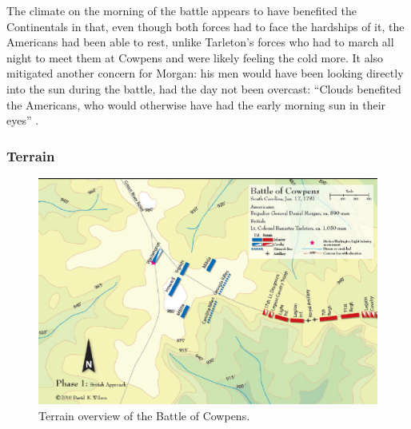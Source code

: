 The climate on the morning of the battle appears to have benefited the
Continentals in that, even though both forces had to face the hardships of it,
the Americans had been able to rest, unlike Tarleton's forces who had to march
all night to meet them at Cowpens and were likely feeling the cold more.  It
also mitigated another concern for Morgan: his men would have been looking
directly into the sun during the battle, had the day not been overcast:
``Clouds benefited the Americans, who would otherwise have had the early
morning sun in their eyes'' \cite[67]{moncure_cowpens_1996}.  

\subsubsection{Terrain}

\begin{figure}[h]
    \begin{center}
    \includegraphics[width=\textwidth]{gfx/futch1}
    \end{center}
    \caption{Terrain overview of the Battle of Cowpens. \cite{wilson_blogmap}}
    \label{terrain1}
\end{figure}

